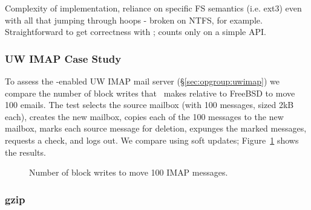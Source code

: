 Complexity of implementation, reliance on specific FS semantics (i.e. ext3)
even with all that jumping through hoops - broken on NTFS, for example.
Straightforward to get correctness with \opgroups; counts only on a simple API.

\subsubsection {UW IMAP Case Study}
\label{sec:evaluation:uwimap}
To assess the \opgroup-enabled UW IMAP mail server
(\S\ref{sec:opgroup:uwimap}) we compare the number of block writes
that \Kudos\ makes relative to FreeBSD to move 100 emails. The test
selects the source mailbox (with 100 messages, sized 2kB each),
creates the new mailbox, copies each of the 100 messages to the new
mailbox, marks each source message for deletion, expunges the marked
messages, requests a check, and logs out. We compare using soft updates;
Figure~\ref{fig:imap-compare} shows the results.

\begin{figure}[htb]
\caption{\label{fig:imap-compare} Number of block writes to move 100
  IMAP messages.}
\end{figure}

\subsubsection {gzip}
